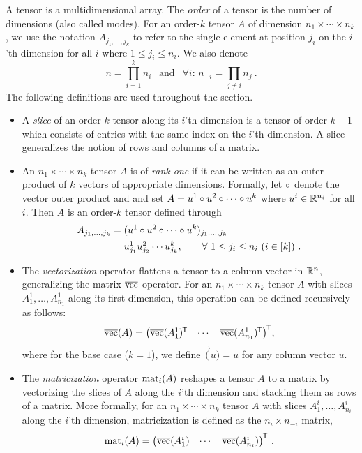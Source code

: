 A tensor is a multidimensional array.  The \emph{order} of a tensor is the
number of dimensions (also called modes).  For an order-$k$ tensor $A$ of
dimension $n_1 \times \cdots \times n_k$, we use the notation
$A_{j_1,\ldots,j_k}$ to refer to the single element at position $j_i$ on the
$i$'th dimension for all $i$ where $1 \le j_i \le n_i$.
We also denote
$$n = \prod_{i=1}^k n_i ~~ \mbox{ and } ~~ \forall i: \, n_{-i} = \prod_{j \ne i} n_j ~ .$$
The following definitions are used throughout the section.
\begin{itemize}%
\item
A \emph{slice} of an order-$k$ tensor along its $i$'th dimension is a tensor of order $k-1$
which consists of entries with the same index on the $i$'th dimension. A slice generalizes the
notion of rows and columns of a matrix.

\item
An $n_1 \times \cdots \times n_k$ tensor $A$ is of \emph{rank one} if it can be written as an outer product of
$k$ vectors of appropriate dimensions. Formally, let $\out$ denote the vector outer product and
and set $A = u^1 \out u^2 \out \cdots \out u^k$ where $u^i \in \reals^{n_i}$ for all $i$. Then $A$ is an
order-$k$ tensor defined through
\begin{align*}
A_{j_1, \ldots, j_k}
&=
(u^1 \out u^2 \out \cdots \out u^k)_{j_1, \ldots, j_k}
\\
&=
u^1_{j_1} u^2_{j_2} \cdots u^k_{j_k}
,
\qquad
\forall ~
1 \le j_i \le n_i ~ (i \in [k])~
.
\end{align*}

\item
The \emph{vectorization} operator flattens a tensor to a column vector in $\reals^{n}$, generalizing the matrix $\vec$ operator.
For an $n_1 \times \cdots \times n_k$ tensor $A$ with slices $A^1_1,\ldots,A^1_{n_1}$ along its first dimension, this operation can be defined recursively as follows:
\begin{align*}
\vec(A) = \Lr{ \begin{matrix} \vec(A^1_1)\tr & \cdots & \vec(A^1_{n_1})\tr \end{matrix} }\tr
,
\end{align*}
where for the base case ($k=1$), we define $\vec(u) = u$ for any column vector $u$.

\item
The \emph{matricization} operator $\mat{i}{A}$ reshapes a tensor $A$ to a matrix by vectorizing the slices of $A$ along the $i$'th dimension and stacking them as rows of a matrix.
More formally, for an $n_1 \times \cdots \times n_k$ tensor $A$ with slices $A^i_1,\ldots,A^i_{n_i}$ along the $i$'th dimension, matricization is defined as the $n_i \times n_{-i}$ matrix,
\begin{align*}
\mat{i}{A}
=
\Lr{ \begin{matrix} \vec(A^i_1) & \cdots & \vec(A^i_{n_i}) \end{matrix} }\tr ~
.
\end{align*}


\end{itemize}
